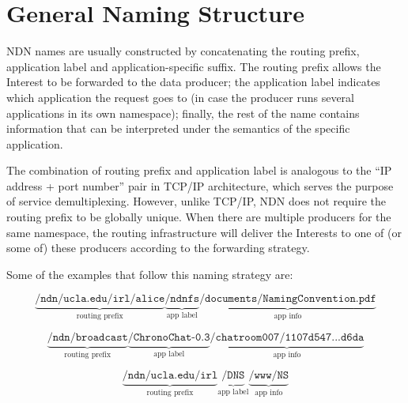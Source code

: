 \section{General Naming Structure}

NDN names are usually constructed by concatenating the routing prefix, application label and application-specific suffix. The routing prefix allows the Interest to be forwarded to the data producer; the application label indicates which application the request goes to (in case the producer runs several applications in its own namespace); finally, the rest of the name contains information that can be interpreted under the semantics of the specific application.

The combination of routing prefix and application label is analogous to the ``IP address + port number'' pair in TCP/IP architecture, which serves the purpose of service demultiplexing. However, unlike TCP/IP, NDN does not require the routing prefix to be globally unique. When there are multiple producers for the same namespace, the routing infrastructure will deliver the Interests to one of (or some of) these producers according to the forwarding strategy.

Some of the examples that follow this naming strategy are:

\[
\underbrace{\texttt{/ndn/ucla.edu/irl/alice}}_\text{routing prefix}
\underbrace{\texttt{/ndnfs}}_\text{app label}
\underbrace{\texttt{/documents/NamingConvention.pdf}}_\text{app info}
\]

\[
\underbrace{\texttt{/ndn/broadcast}}_\text{routing prefix}
\underbrace{\texttt{/ChronoChat-0.3}}_\text{app label}
\underbrace{\texttt{/chatroom007/1107d547...d6da}}_\text{app info}
\]

\[
\underbrace{\texttt{/ndn/ucla.edu/irl}}_\text{routing prefix}
\underbrace{\texttt{/DNS}}_\text{app label}
\underbrace{\texttt{/www/NS}}_\text{app info}
\]


